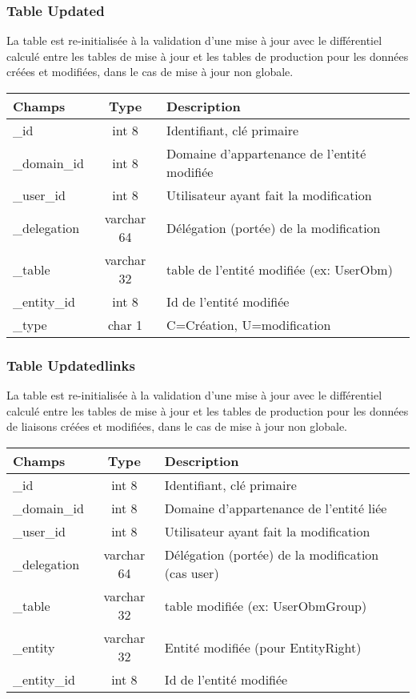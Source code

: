 \subsubsection{Table Updated}

La table  est re-initialisée à la validation d'une mise à jour avec le différentiel calculé entre les tables de mise à jour et les tables de production pour les données créées et modifiées, dans le cas de mise à jour non globale.\\

\begin{tabular}{|p{3cm}|c|p{8cm}|}
\hline
\textbf{Champs} & \textbf{Type} & \textbf{Description} \\
\hline
\_id & int 8 & Identifiant, clé primaire \\
\hline
\_domain\_id & int 8 & Domaine d'appartenance de l'entité modifiée \\
\hline
\_user\_id & int 8 & Utilisateur ayant fait la modification \\
\hline
\_delegation & varchar 64 & Délégation (portée) de la modification \\
\hline
\_table & varchar 32 & table de l'entité modifiée (ex: UserObm) \\
\hline
\_entity\_id & int 8 & Id de l'entité modifiée \\
\hline
\_type & char 1 & C=Création, U=modification \\
\hline
\end{tabular}


\subsubsection{Table Updatedlinks}

La table  est re-initialisée à la validation d'une mise à jour avec le différentiel calculé entre les tables de mise à jour et les tables de production pour les données de liaisons créées et modifiées, dans le cas de mise à jour non globale.\\

\begin{tabular}{|p{3cm}|c|p{8cm}|}
\hline
\textbf{Champs} & \textbf{Type} & \textbf{Description} \\
\hline
\_id & int 8 & Identifiant, clé primaire \\
\hline
\_domain\_id & int 8 & Domaine d'appartenance de l'entité liée \\
\hline
\_user\_id & int 8 & Utilisateur ayant fait la modification \\
\hline
\_delegation & varchar 64 & Délégation (portée) de la modification (cas user)\\
\hline
\_table & varchar 32 & table modifiée (ex: UserObmGroup) \\
\hline
\_entity & varchar 32 & Entité modifiée (pour EntityRight) \\
\hline
\_entity\_id & int 8 & Id de l'entité modifiée \\
\hline
\end{tabular}
\vspace{0,3cm}

